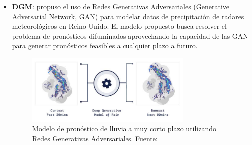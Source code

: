 \begin{itemize}
  \item \textbf{DGM}: \cite{Ravuri2021} propuso el uso de Redes Generativas 
  Adversariales (Generative Adversarial Network, GAN) para modelar datos de 
  precipitación de radares meteorológicos en Reino Unido. El modelo propuesto 
  busca resolver el problema de pronósticos difuminados aprovechando la 
  capacidad de las GAN para generar pronósticos feasibles a cualquier plazo a 
  futuro.
  \begin{figure}[H]
    \centering
    \includegraphics[width=8cm]{E_IMAGENES/3_EstadoArte/dgmr_1}
    \caption[Modelo GAN]{
      Modelo de pronóstico de lluvia a muy corto plazo utilizando Redes 
      Generativas Adversariales. Fuente: \cite{Ravuri2021}
    }
    \label{fig:dgmr_modelo}
  \end{figure}
\end{itemize}

